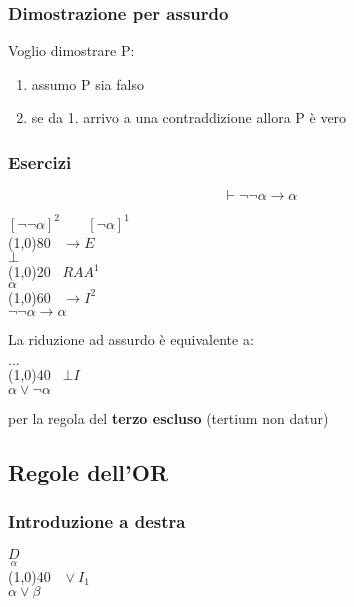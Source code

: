 \documentclass{article}
\theoremstyle{break}
\theoremstyle{break}
\theoremstyle{break}
\theoremstyle{break}
\begin{document}
\subsubsection{Dimostrazione per assurdo}
Voglio dimostrare P:
\begin{enumerate}
    \item assumo P sia falso
    \item se da 1. arrivo a una contraddizione allora P è vero
\end{enumerate}

\subsubsection{Esercizi}

\begin{example}
    \[
        \vdash \neg \neg \alpha \to \alpha
    \] 
        \begin{center}
            \( [\neg \neg \alpha]^2 \;\;\;\;\;\;\; [\neg \alpha]^1\) \\
     \hspace{1cm}\line(1,0){80}\(\;\;\; \to E\)\\
        \( \bot\) \\
         \hspace{1.2cm}\line(1,0){20}\(\;\;\; RAA^1  \)\\
        \( \alpha\) \\
         \hspace{1cm}\line(1,0){60}\(\;\;\; \to I^2\)\\
        \( \neg \neg \alpha \to \alpha\) \\
    \end{center}
\end{example}
La riduzione ad assurdo è equivalente a:
\begin{center}
          \( \ldots \)\\ 
        \hspace{0.8cm}\line(1,0){40}\(\;\;\; \bot I \)\\  
        \( \alpha \vee \neg \alpha \) 
\end{center} 
per la regola del \textbf{terzo escluso} (tertium non datur)

\subsection{Regole dell'OR}
\subsubsection{Introduzione a destra}
\begin{center}
    \( \underset{\alpha}{D} \) \\
    \hspace{0.9cm}\line(1,0){40}\(\;\;\; \vee I_1 \)\\  
    \( \alpha \vee \beta \)
\end{center}
\end{document}
